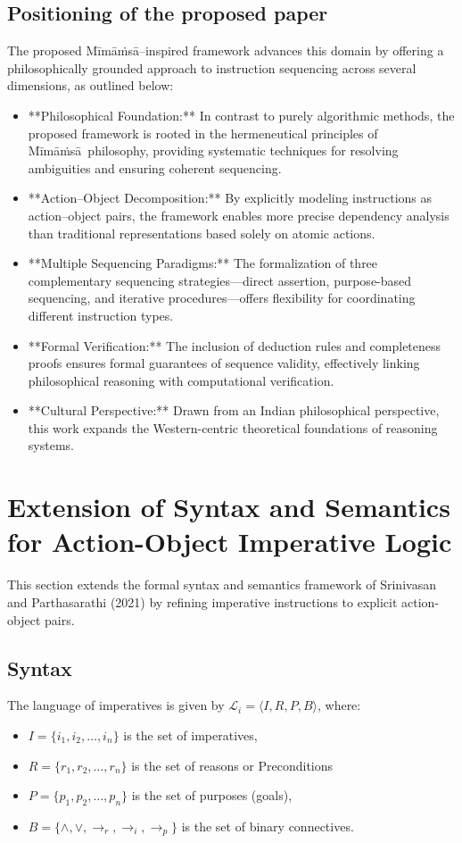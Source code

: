 \documentclass[a4paper,11pt]{lmcs}
\newcommand{\mimamsa}{M\={i}m\={a}\.ms\={a}}
\begin{document}
\subsection*{Positioning of the proposed paper}
The proposed \mimamsa–inspired framework advances this domain by offering a philosophically grounded approach to instruction sequencing across several dimensions, as outlined below:
\begin{itemize}
\item **Philosophical Foundation:** In contrast to purely algorithmic methods, the proposed framework is rooted in the hermeneutical principles of \mimamsa~philosophy, providing systematic techniques for resolving ambiguities and ensuring coherent sequencing.
\item **Action–Object Decomposition:** By explicitly modeling instructions as action–object pairs, the framework enables more precise dependency analysis than traditional representations based solely on atomic actions.
\item **Multiple Sequencing Paradigms:** The formalization of three complementary sequencing strategies—direct assertion, purpose-based sequencing, and iterative procedures—offers flexibility for coordinating different instruction types.
\item **Formal Verification:** The inclusion of deduction rules and completeness proofs ensures formal guarantees of sequence validity, effectively linking philosophical reasoning with computational verification.
\item **Cultural Perspective:** Drawn from an Indian philosophical perspective, this work expands the Western-centric theoretical foundations of reasoning systems.
\end{itemize}

 \section{Extension of Syntax and Semantics for Action-Object Imperative Logic}
 \label{sec:syn_sem}
This section extends the formal syntax and semantics framework of Srinivasan and Parthasarathi (2021) \cite{mira} by refining imperative instructions to explicit action-object pairs.
\subsection{Syntax}
\label{sec:syntax}
The language of imperatives is given by \(\mathcal{L}_i = \langle I, R, P, B \rangle\), where:
\begin{itemize}
  \item \(I = \{ i_1, i_2, \ldots, i_n \}\) is the set of imperatives,
  \item \(R = \{ r_1, r_2, \ldots, r_n \}\) is the set of reasons or Preconditions
  \item \(P = \{ p_1, p_2, \ldots, p_n \}\) is the set of purposes (goals),
  \item \(B = \{ \wedge, \vee, \rightarrow_r, \rightarrow_i, \rightarrow_p \}\) is the set of binary connectives.
\end{itemize}
\end{document}
